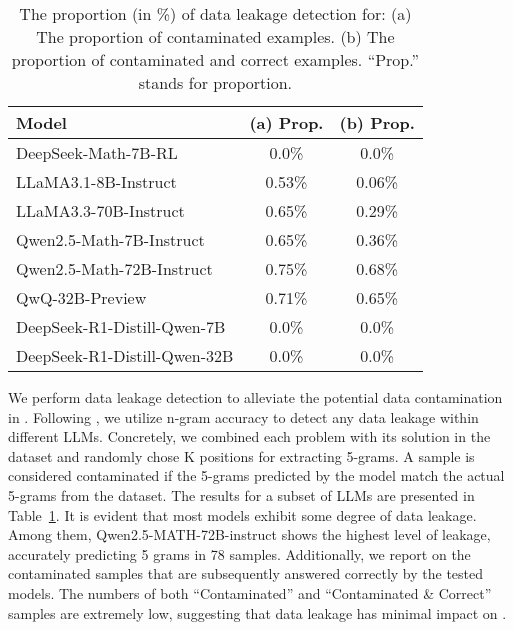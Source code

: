 \begin{table}[t]
\centering
\footnotesize
\caption{The proportion (in \%) of data leakage detection for: (a) The proportion of contaminated examples. (b) The proportion of contaminated and correct examples. ``Prop.'' stands for proportion.}
\begin{tabular}{lcc}
\toprule
\textbf{Model}& \textbf{(a) Prop.} & \textbf{(b) Prop.} \\
\midrule
DeepSeek-Math-7B-RL & 0.0\% & 0.0\% \\
LLaMA3.1-8B-Instruct & 0.53\% & 0.06\% \\
LLaMA3.3-70B-Instruct & 0.65\% & 0.29\% \\
Qwen2.5-Math-7B-Instruct & 0.65\% & 0.36\% \\
Qwen2.5-Math-72B-Instruct & 0.75\% & 0.68\% \\
QwQ-32B-Preview & 0.71\% & 0.65\% \\
DeepSeek-R1-Distill-Qwen-7B & 0.0\% & 0.0\% \\
DeepSeek-R1-Distill-Qwen-32B & 0.0\% & 0.0\% 
\\
\bottomrule
\end{tabular}
\label{tab:contamination}
\end{table}

We perform data leakage detection to alleviate the potential data contamination in {\benchmark}.
Following \citet{benbench2024xu}, we utilize n-gram accuracy to detect any data leakage within different LLMs. 
Concretely, we combined each problem with its solution in the dataset and randomly chose K positions for extracting 5-grams.
A sample is considered contaminated if the 5-grams predicted by the model match the actual 5-grams from the dataset. 
The results for a subset of LLMs are presented in Table~\ref{tab:contamination}. 
It is evident that most models exhibit some degree of data leakage.
Among them, Qwen2.5-MATH-72B-instruct shows the highest level of leakage, accurately predicting 5 grams in 78 samples. 
Additionally, we report on the contaminated samples that are subsequently answered correctly by the tested models. 
The numbers of both ``Contaminated'' and ``Contaminated \& Correct'' samples are extremely low, suggesting that data leakage has minimal impact on {\benchmark}. 


